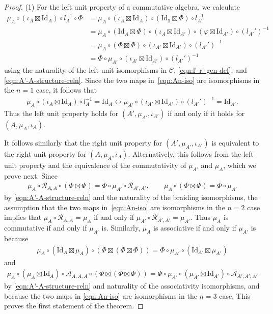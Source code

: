 \documentclass[10pt,a4paper]{amsart}
\begin{document}
\begin{proof}
(1) For the left unit property of a commutative algebra, we calculate
\begin{align*}
\mu_A\circ(\iota_A\boxtimes\mathrm{Id}_A)\circ l_A^{-1}\circ\Phi & = \mu_A\circ(\iota_A\boxtimes\mathrm{Id}_A)\circ(\mathrm{Id}_{\mathbf{1}}\boxtimes\Phi)\circ l_{A'}^{-1}\nonumber\\
& =\mu_A\circ(\mathrm{Id}_{A}\boxtimes\Phi)\circ(\iota_A\boxtimes\mathrm{Id}_{A'})\circ(\varphi\boxtimes\mathrm{Id}_{A'})\circ(l_{A'}')^{-1}\nonumber\\
& =\mu_A\circ(\Phi\boxtimes\Phi)\circ(\iota_{A'}\boxtimes\mathrm{Id}_{A'})\circ(l_{A'}')^{-1} \nonumber\\
&=\Phi\circ\mu_{A'}\circ(\iota_{A'}\boxtimes\mathrm{Id}_{A'})\circ(l_{A'}')^{-1}
\end{align*}
using the naturality of the left unit isomorphisms in $\mathcal{C}$, \eqref{eqn:l'-r'-gen-def}, and \eqref{eqn:A'-A-structure-reln}.
Since the two maps in~\eqref{eqn:An-iso} are isomorphisms in the $n=1$ case, it follows that
\begin{gather*}
\mu_A\circ(\iota_A\boxtimes\mathrm{Id}_A)\circ l_A^{-1} =\mathrm{Id}_A\longleftrightarrow \mu_{A'}\circ(\iota_{A'}\boxtimes\mathrm{Id}_{A'})\circ(l_{A'}')^{-1}=\mathrm{Id}_{A'}.
\end{gather*}
Thus the left unit property holds for $(A',\mu_{A'},\iota_{A'})$ if and only if it holds for $(A,\mu_A,\iota_A)$.

It follows similarly that the right unit property for $(A',\mu_{A'},\iota_{A'})$ is equivalent to the right unit property for $(A,\mu_A,\iota_A)$. Alternatively, this follows from the left unit property and the equivalence of the commutativity of $\mu_{A'}$ and $\mu_A$, which we prove next. Since
\begin{align*}
\mu_A\circ\mathcal{R}_{A,A}\circ(\Phi\boxtimes\Phi) =\Phi\circ\mu_{A'}\circ\mathcal{R}_{A',A'},\qquad\mu_A\circ(\Phi\boxtimes\Phi)=\Phi\circ\mu_{A'}
\end{align*}
by \eqref{eqn:A'-A-structure-reln} and the naturality of the braiding isomorphisms, the assumption that the two maps in~\eqref{eqn:An-iso} are isomorphisms in the $n=2$ case implies that $\mu_A\circ\mathcal{R}_{A,A}=\mu_A$ if and only if $\mu_{A'}\circ\mathcal{R}_{A',A'}=\mu_{A'}$. Thus $\mu_A$ is commutative if and only if $\mu_{A'}$ is. Similarly, $\mu_A$ is associative if and only if $\mu_{A'}$ is because
\begin{align*}
\mu_A\circ(\mathrm{Id}_A\boxtimes\mu_A)\circ(\Phi\boxtimes(\Phi\boxtimes\Phi)) =\Phi\circ\mu_{A'}\circ(\mathrm{Id}_{A'}\boxtimes\mu_{A'})
\end{align*}
and
\begin{gather*}
\mu_A\circ(\mu_A\boxtimes\mathrm{Id}_A)\circ\mathcal{A}_{A,A,A}\circ(\Phi\boxtimes(\Phi\boxtimes\Phi)) = \Phi\circ\mu_{A'}\circ(\mu_{A'}\boxtimes\mathrm{Id}_{A'})\circ\mathcal{A}_{A',A',A'}
\end{gather*}
by \eqref{eqn:A'-A-structure-reln} and naturality of the associativity isomorphisms, and because the two maps in \eqref{eqn:An-iso} are isomorphisms in the $n=3$ case.
This proves the first statement of the theorem.


\end{proof}
\end{document}
